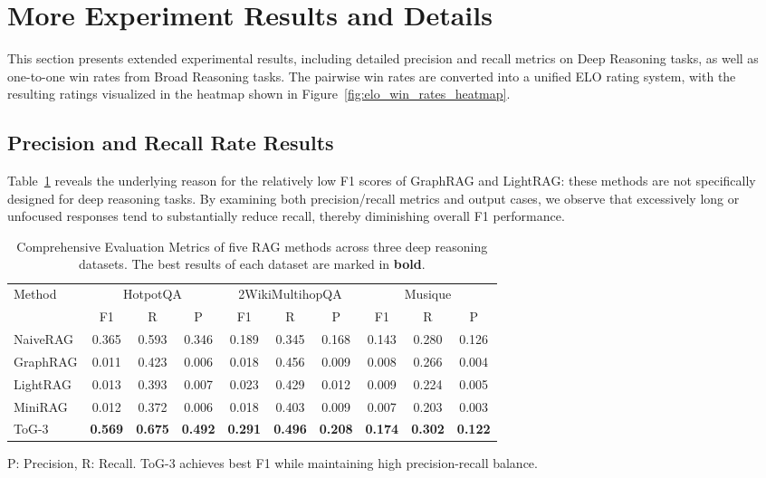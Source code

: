 \section{More Experiment Results and Details}
\label{appendix:more_result_details}
This section presents extended experimental results, including detailed precision and recall metrics on Deep Reasoning tasks, as well as one-to-one win rates from Broad Reasoning tasks. The pairwise win rates are converted into a unified ELO rating system, with the resulting ratings visualized in the heatmap shown in Figure~\ref{fig:elo_win_rates_heatmap}.

\subsection{Precision and Recall Rate Results}
\label{appendix:pr_result}
Table~\ref{tab:pr_results} reveals the underlying reason for the relatively low F1 scores of GraphRAG and LightRAG: these methods are not specifically designed for deep reasoning tasks. By examining both precision/recall metrics and output cases, we observe that excessively long or unfocused responses tend to substantially reduce recall, thereby diminishing overall F1 performance.

\begin{table}[t]
\centering
\caption{Comprehensive Evaluation Metrics of five RAG methods across three deep reasoning datasets. The best results of each dataset are marked in \textbf{bold}.}
\small
\begin{tabular}{lccccccccc}
\toprule
\multirow{2}{*}{Method} & \multicolumn{3}{c}{HotpotQA} & \multicolumn{3}{c}{2WikiMultihopQA} &  \multicolumn{3}{c}{Musique} \\
\cmidrule(lr){2-4} \cmidrule(lr){5-7} \cmidrule(lr){8-10}
 & F1 & R & P & F1 & R & P & F1 & R & P \\
\midrule
NaiveRAG & 0.365 & 0.593 & 0.346  & 0.189 & 0.345 & 0.168 & 0.143 & 0.280 & 0.126 \\
GraphRAG & 0.011 & 0.423 & 0.006 & 0.018 & 0.456 & 0.009 & 0.008 & 0.266 & 0.004 \\
LightRAG & 0.013 & 0.393 & 0.007 & 0.023 & 0.429 & 0.012 & 0.009 & 0.224 & 0.005 \\
MiniRAG & 0.012 & 0.372 & 0.006 & 0.018 & 0.403 & 0.009 & 0.007 & 0.203 & 0.003 \\
\midrule
ToG-3 & \textbf{0.569} & \textbf{0.675} & \textbf{0.492} & \textbf{0.291} & \textbf{0.496} & \textbf{0.208} &  \textbf{0.174} & \textbf{0.302} & \textbf{0.122} \\
\bottomrule
\end{tabular}
\begin{tablenotes}
\small
\item P: Precision, R: Recall. ToG-3 achieves best F1 while maintaining high precision-recall balance.
\end{tablenotes}
\label{tab:pr_results}
\end{table}

